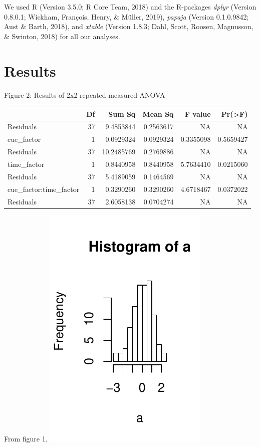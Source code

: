\documentclass[man,floatsintext]{apa6}
\begin{document}
We used R (Version 3.5.0; R Core Team, 2018) and the R-packages
\emph{dplyr} (Version 0.8.0.1; Wickham, François, Henry, \& Müller,
2019), \emph{papaja} (Version 0.1.0.9842; Aust \& Barth, 2018), and
\emph{xtable} (Version 1.8.3; Dahl, Scott, Roosen, Magnusson, \&
Swinton, 2018) for all our analyses.

\section{Results}\label{results}

Figure 2: Results of 2x2 repeated measured ANOVA

\begin{tabular}{l|r|r|r|r|r}
\hline
  & Df & Sum Sq & Mean Sq & F value & Pr(>F)\\
\hline
Residuals & 37 & 9.4853844 & 0.2563617 & NA & NA\\
\hline
cue\_factor & 1 & 0.0929324 & 0.0929324 & 0.3355098 & 0.5659427\\
\hline
Residuals & 37 & 10.2485769 & 0.2769886 & NA & NA\\
\hline
time\_factor & 1 & 0.8440958 & 0.8440958 & 5.7634410 & 0.0215060\\
\hline
Residuals & 37 & 5.4189059 & 0.1464569 & NA & NA\\
\hline
cue\_factor:time\_factor & 1 & 0.3290260 & 0.3290260 & 4.6718467 & 0.0372022\\
\hline
Residuals & 37 & 2.6058138 & 0.0704274 & NA & NA\\
\hline
\end{tabular}

From figure 1. \includegraphics{first_apa_files/figure-latex/fig1-1.pdf}
\end{document}
